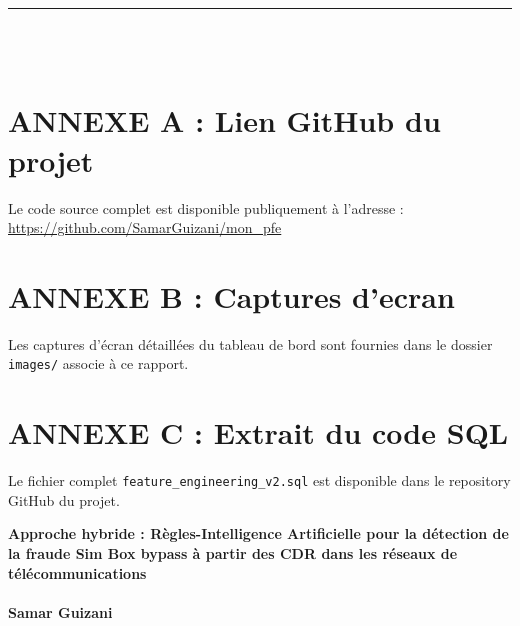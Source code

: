 \documentclass[12pt, oneside, a4paper]{report}
\newcommand{\chapterhead}[1]{%
  \noindent\rule[-0.2cm]{0.45cm}{1.2cm}\hspace{0.15cm}%
  \raisebox{0.85cm}{\rule{0.85\textwidth}{0.5pt}}\\[0.3cm]
  \noindent\hspace*{0.6cm}{\Huge\textbf{#1}}\\[1.5cm]
}
\begin{document}
\clearpage
\thispagestyle{plain}
\chapterhead{ANNEXES}

\section*{ANNEXE A : Lien GitHub du projet}
Le code source complet est disponible publiquement à l'adresse :\\
\url{https://github.com/SamarGuizani/mon_pfe}

\section*{ANNEXE B : Captures d'ecran}
Les captures d'écran détaillées du tableau de bord sont fournies dans le dossier \texttt{images/} associe à ce rapport.

\section*{ANNEXE C : Extrait du code SQL}
Le fichier complet \texttt{feature\_engineering\_v2.sql} est disponible dans le repository GitHub du projet.

\newpage
\thispagestyle{empty}

\begin{center}

    {\fontsize{13pt}{16pt}\selectfont \textbf{\color{blue} Approche hybride : Règles-Intelligence Artificielle pour la détection de la fraude Sim Box bypass à partir des CDR dans les réseaux de télécommunications }} \\[0.4cm]

    \noindent{} \\[0.3cm]

    {\fontsize{12pt}{15pt}\selectfont \textbf{\color{blue} Samar Guizani}} \\[0.3cm]

    \noindent{} \\[0.8cm]

\end{center}
\end{document}
